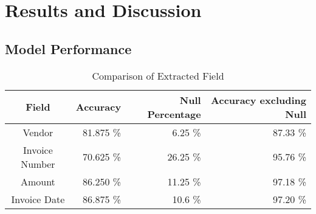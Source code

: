 \chapter{Results and Discussion}

\section{Model Performance}

\begin{table}[ht]   %
    \centering
    \footnotesize
    \begin{tabular}{c|rrr} %
        \toprule    %
        Field  & Accuracy  & Null Percentage & Accuracy excluding Null \\
        \midrule    %
        Vendor           & 81.875 \%   &  6.25 \%   & 87.33 \% \\
        Invoice Number   & 70.625 \%   & 26.25 \%  & 95.76 \%\\
        Amount           & 86.250 \%   & 11.25 \%  & 97.18 \% \\
        Invoice Date     & 86.875 \%   & 10.6  \%  & 97.20 \% \\
        \bottomrule %
    \end{tabular}
    \caption{Comparison of Extracted Field}
    \label{table:Field_Com}
\end{table}


